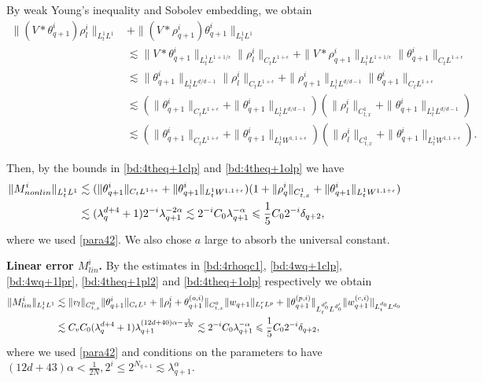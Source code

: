 \documentclass[UTF-8,reqno]{amsart}
\numberwithin{equation}{section}
\theoremstyle{definition}
\def\leq{\leqslant}
\def\leq{\leqslant}
\begin{document}
By weak Young's inequality and Sobolev embedding, we obtain 
\begin{align*}
    \|(V*\theta_{q+1}^i)\rho_{l}^i\|_{L^1_tL^1}&+\|(V*\rho_{q+1}^i)\theta_{q+1}^i \|_{L^1_tL^1}\\
    &\lesssim \|V*\theta_{q+1}^i\|_{L_t^1L^{1+1/\epsilon}}\|\rho_{l}^i\|_{C_tL^{1+\epsilon}}+\|V*\rho_{q+1}^i\|_{L_t^1L^{1+1/\epsilon}}\|\theta_{q+1}^i \|_{C_tL^{1+\epsilon}}\\
    &\lesssim \| \theta_{q+1}^i\|_{L^1_tL^{d/d-1}}\|\rho_{l}^i\|_{C_tL^{1+\epsilon}}+\| \rho_{q+1}^i\|_{L^1_tL^{d/d-1}}\|\theta_{q+1}^i \|_{C_tL^{1+\epsilon}}\\
    &\lesssim (\|\theta_{q+1}^i \|_{C_tL^{1+\epsilon}}+\| \theta_{q+1}^i\|_{L^1_tL^{d/d-1}})(\|\rho_{l}^i\|_{C_{t,x}^1}+\| \theta_{q+1}^i\|_{L^1_tL^{d/d-1}} )\\
    &\lesssim (\|\theta_{q+1}^i \|_{C_tL^{1+\epsilon}}+\| \theta_{q+1}^i\|_{L^1_tW^{1,1+\epsilon}})(\|\rho_{l}^i\|_{C_{t,x}^1}+\|  \theta_{q+1}^i\|_{L^1_tW^{1,1+\epsilon}} ).
\end{align*}
 
Then, by     the bounds in  \eqref{bd:4theq+1clp}  and \eqref{bd:4theq+1olp}    we have
\begin{align}
    \|M^{i}_{nonlin}\|_{L^1_tL^1} 
      &\lesssim ( \|\theta^{i}_{q+1}\|_{C_tL^{1+\epsilon}}+ \|\theta^{i}_{q+1}\|_{L^1_tW^{1,1+\epsilon}})  (1+\|\rho^{i}_{q}\|_{C_{t,x}^1}+\| \theta_{q+1}^i\|_{L^1_tW^{1,1+\epsilon}} )  \notag\\
      &\lesssim( \lambda_{q}^{d+4}+1)2^{-i}\lambda_{q+1}^{-2\alpha}\lesssim  2^{-i} C_0 \lambda_{q+1}^{-\alpha}\leq \frac{1}{5}C_02^{-i}\delta_{q+2},\label{arhorho-arhorho}
\end{align}
where we used  \eqref{para42}. We also chose $a$ large to absorb the universal constant. 


\textbf{Linear error $M^{i}_{lin}$.} 
By the estimates  
in \eqref{bd:4rhoqc1}, \eqref{bd:4wq+1clp}, \eqref{bd:4wq+1lpr}, \eqref{bd:4theq+1pl2} and  \eqref{bd:4theq+1olp} respectively we obtain
\begin{align}
 \|M^{i}_{lin}\|_{L^1_tL^1}&\lesssim \|v_l\|_{C_{t,x}^0}\|\theta_{q+1}^{i}\|_{C_tL^1}+\|\rho^{i}_l+\theta_{q+1}^{(o,i)}\|_{C_{t,x}^0}
\|w_{q+1}\|_{L^r_tL^p}+   \| \theta_{q+1}^{(p,i)}\|_{L^{d_0'}_tL^{d_0'}}\|w_{q+1}^{(c,i)}\|_{L^{d_0}_tL^{d_0}}\notag\\
&\lesssim C_vC_0(\lambda_{q}^{d+4}+1)\lambda_{q+1}^{(12d+40)\alpha-\frac1{2N}}
\lesssim 2^{-i} C_0 \lambda_{q+1}^{-\alpha}\leq  \frac{1}{5}C_02^{-i}\delta_{q+2},\notag
\end{align}
where we used  \eqref{para42} and   conditions on the parameters to have $(12d+43)\alpha<\frac{1}{2N},2^i\leq2^{N_{q+1}}\lesssim \lambda_{q+1}^\alpha$. 
\end{document}
